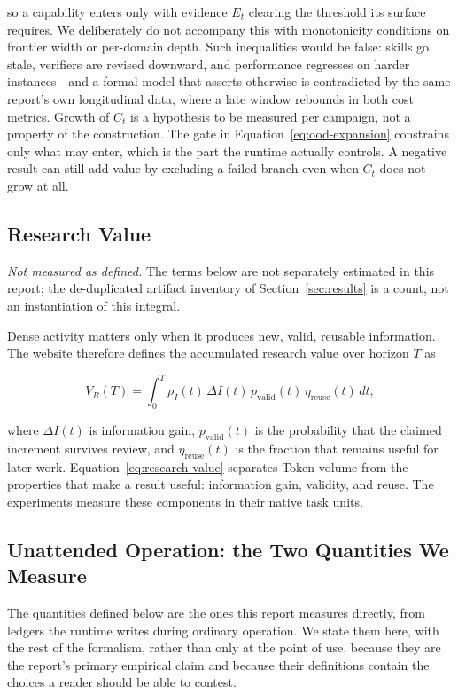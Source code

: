 so a capability enters only with evidence $E_t$ clearing the threshold its surface
requires. We deliberately do not accompany this with monotonicity conditions on
frontier width or per-domain depth. Such inequalities would be false: skills go
stale, verifiers are revised downward, and performance regresses on harder
instances---and a formal model that asserts otherwise is contradicted by the same
report's own longitudinal data, where a late window rebounds in both cost metrics.
Growth of $C_t$ is a hypothesis to be measured per campaign, not a property of the
construction. The gate in Equation~\ref{eq:ood-expansion} constrains only what may
enter, which is the part the runtime actually controls. A negative result can still
add value by excluding a failed branch even when $C_t$ does not grow at all.

\subsection{Research Value}

\emph{Not measured as defined.} The terms below are not separately estimated in
this report; the de-duplicated artifact inventory of Section~\ref{sec:results} is a
count, not an instantiation of this integral.

Dense activity matters only when it produces new, valid, reusable information. The
website therefore defines the accumulated research value over horizon $T$ as

\begin{equation}
  V_R(T)
  =\int_0^T
  \rho_I(t)\,\Delta I(t)\,p_{\mathrm{valid}}(t)\,
  \eta_{\mathrm{reuse}}(t)\,dt,
  \label{eq:research-value}
\end{equation}

where $\Delta I(t)$ is information gain, $p_{\mathrm{valid}}(t)$ is the probability
that the claimed increment survives review, and
$\eta_{\mathrm{reuse}}(t)$ is the fraction that remains useful for later work.
Equation~\ref{eq:research-value} separates Token volume from the properties that
make a result useful: information gain, validity, and reuse. The experiments measure
these components in their native task units.

\subsection{Unattended Operation: the Two Quantities We Measure}
\label{sec:unattended-formal}

The quantities defined below are the ones this report measures directly, from
ledgers the runtime writes during ordinary operation. We state them here, with the
rest of the formalism, rather than only at the point of use, because they are the
report's primary empirical claim and because their definitions contain the choices a
reader should be able to contest.

